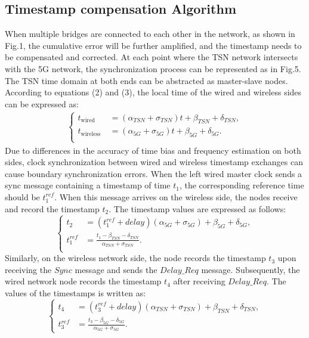\documentclass[english]{cccconf}
\begin{document}
\subsection{Timestamp compensation Algorithm}
When multiple bridges are connected to each other in the network, as shown in Fig.1, the cumulative error will be further amplified, and the timestamp needs to be compensated and corrected. At each point where the TSN network intersects with the 5G network, the synchronization process can be represented as in Fig.5. The TSN time domain at both ends can be abstracted as master-slave nodes. According to equations (2) and (3), the local time of the wired and wireless sides can be expressed as:
\begin{eqnarray}
	\left\{
	\begin{aligned}
		t_{\text {wired}}&=\left(\alpha_{TSN}+\sigma_{TSN}\right) t+\beta_{TSN}+\delta_{TSN},\\
		t_{\text {wireless }}&=\left(\alpha_{5G}+\sigma_{5G}\right) t+\beta_{5G}+\delta_{5G}.\\
	\end{aligned}
    \right.
\end{eqnarray}
Due to differences in the accuracy of time bias and frequency estimation on both sides, clock synchronization between wired and wireless timestamp exchanges can cause boundary synchronization errors. When the left wired master clock sends a sync message containing a timestamp of time $t_1$, the corresponding reference time should be $t_1^{ref}$. When this message arrives on the wireless side, the nodes receive and record the timestamp $t_2$. The timestamp values are expressed as follows:
\begin{equation}
	\left\{
	\begin{aligned}
		t_{2}&=(t_1^{ref}+delay)(\alpha_{5G}+\sigma_{5G})+\beta_{5G}+\delta_{5G},\\
		t_1^{ref}&=\frac{t_{1}-\beta_{TSN}-\delta_{TSN}}{\alpha_{TSN}+\sigma_{TSN}}.\\
	\end{aligned}
	\right.	
\end{equation}
Similarly, on the wireless network side, the node records the timestamp $t_3$ upon receiving the $Sync$ message and sends the  $Delay\_Req$ message. Subsequently, the wired network node records the timestamp $t_4$ after receiving  $Delay\_Req$. The values of the timestamps is written as:
\begin{equation}
	\left\{
	\begin{aligned}
		t_{4}&=(t_3^{ref}+delay)(\alpha_{TSN}+\sigma_{TSN})+\beta_{TSN}+\delta_{TSN},\\
		t_3^{ref}&=\frac{t_{3}-\beta_{5G}-\delta_{5G}}{\alpha_{5G}+\sigma_{5G}}.
	\end{aligned}
	\right.	
\end{equation}
\end{document}
